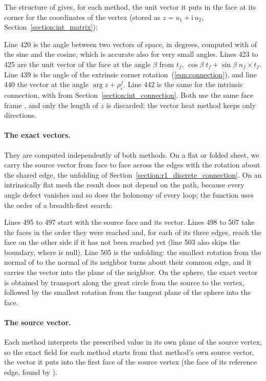 The structure  of  gives, for each method, the unit vector it puts in the face  at its corner  for the coordinates  of the vertex (stored as $z = u_1 + \mathrm i\,u_2$, Section~\ref{section:int_matrix}):

Line 420 is the angle between two vectors of space, in degrees, computed with  of the sine and the cosine, which is accurate also for very small angles. Lines 423 to 425 are the unit vector of the face at the angle $\beta$ from $t_f$, $\cos\beta\; t_f + \sin\beta\; n_f \times t_f$. Line 439 is the angle of the extrinsic corner rotation~(\ref{eqn:connection}), and line 440 the vector at the angle $\arg z + \rho_i^f$. Line 442 is the same for the intrinsic connection, with  from Section~\ref{section:int_connection}. Both use the same face frame , and only the length of $z$ is discarded: the vector heat method keeps only directions.

\paragraph{The exact vectors.} They are computed independently of both methods. On a flat or folded sheet, we carry the source vector from face to face across the edges with the rotation about the shared edge, the unfolding of Section~\ref{section:r1_discrete_connection}. On an intrinsically flat mesh the result does not depend on the path, because every angle defect vanishes and so does the holonomy of every loop; the function  uses the order of a breadth-first search:

Lines 495 to 497 start with the source face  and its vector. Lines 498 to 507 take the faces in the order they were reached and, for each of its three edges, reach the face on the other side if it has not been reached yet (line 503 also skips the boundary, where  is null). Line 505 is the unfolding: the smallest rotation from the normal of  to the normal of its neighbor turns about their common edge, and it carries the vector into the plane of the neighbor. On the sphere, the exact vector is obtained by transport along the great circle from the source to the vertex, followed by the smallest rotation from the tangent plane of the sphere into the face.

\paragraph{The source vector.} Each method interprets the prescribed value in its own plane of the source vertex, so the exact field for each method starts from that method's own source vector, the vector it puts into the first face of the source vertex (the face of its reference edge, found by ).

